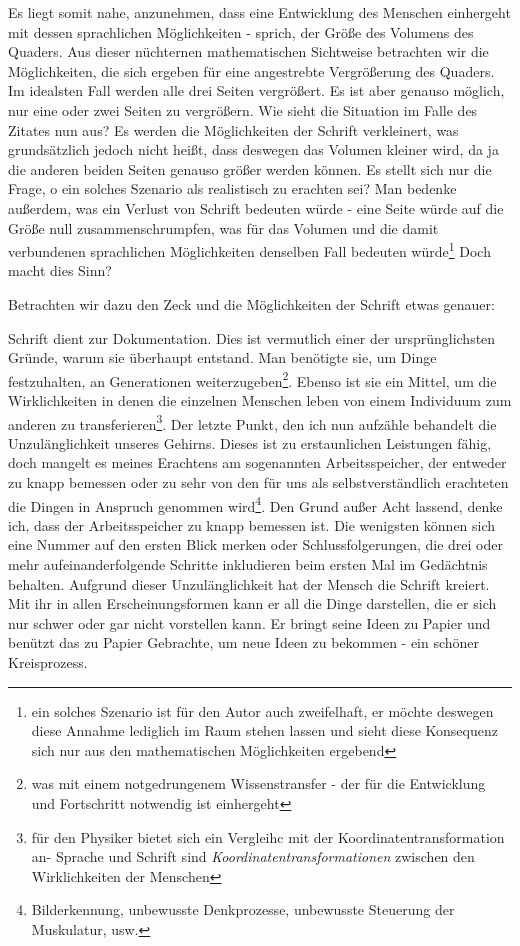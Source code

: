\documentclass[12pt,a4paper,oneside]{article}
\begin{document}
  Es liegt somit nahe, anzunehmen, dass eine Entwicklung des Menschen einhergeht mit dessen sprachlichen Möglichkeiten - sprich, der Größe des Volumens des Quaders. Aus dieser nüchternen mathematischen Sichtweise betrachten wir die Möglichkeiten, die sich ergeben für eine angestrebte Vergrößerung des Quaders. Im idealsten Fall werden alle drei Seiten vergrößert. Es ist aber genauso möglich, nur eine oder zwei Seiten zu vergrößern. Wie sieht die Situation im Falle des Zitates nun aus? Es werden die Möglichkeiten der Schrift verkleinert, was grundsätzlich jedoch nicht heißt, dass deswegen das Volumen kleiner wird, da ja die anderen beiden Seiten genauso größer werden können. Es stellt sich nur die Frage, o ein solches Szenario als realistisch zu erachten sei? Man bedenke außerdem, was ein Verlust von Schrift bedeuten würde - eine Seite würde auf die Größe null zusammenschrumpfen, was für das Volumen und die damit verbundenen sprachlichen Möglichkeiten denselben Fall bedeuten würde\footnote{ein solches Szenario ist für den Autor auch zweifelhaft, er möchte deswegen diese Annahme lediglich im Raum stehen lassen und sieht diese Konsequenz sich nur aus den mathematischen Möglichkeiten ergebend} Doch macht dies Sinn?
  
  Betrachten wir dazu den Zeck und die Möglichkeiten der Schrift etwas genauer:
  
  Schrift dient zur Dokumentation. Dies ist vermutlich einer der ursprünglichsten Gründe, warum sie überhaupt entstand. Man benötigte sie, um Dinge festzuhalten, an Generationen weiterzugeben\footnote{was mit einem notgedrungenem Wissenstransfer - der für die Entwicklung und Fortschritt notwendig ist einhergeht}. Ebenso ist sie ein Mittel, um die Wirklichkeiten in denen die einzelnen Menschen leben von einem Individuum zum anderen zu transferieren\footnote{für den Physiker bietet sich ein Vergleihc mit der Koordinatentransformation an- Sprache und Schrift sind \textit{Koordinatentransformationen} zwischen den Wirklichkeiten der Menschen}. Der letzte Punkt, den ich nun aufzähle behandelt die Unzulänglichkeit unseres Gehirns. Dieses ist zu erstaunlichen Leistungen fähig, doch mangelt es meines Erachtens am sogenannten Arbeitsspeicher, der entweder zu knapp bemessen oder zu sehr von den für uns als selbstverständlich erachteten die Dingen in Anspruch genommen wird\footnote{Bilderkennung, unbewusste Denkprozesse, unbewusste Steuerung der Muskulatur, usw.}. Den Grund außer Acht lassend, denke ich, dass der Arbeitsspeicher zu knapp bemessen ist. Die wenigsten können sich eine Nummer auf den ersten Blick merken oder Schlussfolgerungen, die drei oder mehr aufeinanderfolgende Schritte inkludieren beim ersten Mal im Gedächtnis behalten. Aufgrund dieser Unzulänglichkeit hat der Mensch die Schrift kreiert. Mit ihr in allen Erscheinungsformen kann er all die Dinge darstellen, die er sich nur schwer oder gar nicht vorstellen kann. Er bringt seine Ideen zu Papier und benützt das zu Papier Gebrachte, um neue Ideen zu bekommen - ein schöner Kreisprozess.\\
  
\end{document}
